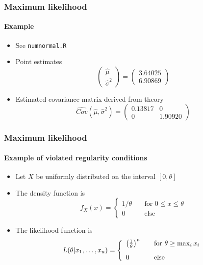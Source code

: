 \documentclass[notes=show]{beamer}
\begin{document}
\begin{frame}\frametitle{Maximum likelihood}\framesubtitle{Example}
\begin{itemize}
    \item See \texttt{numnormal.R}
    \item Point estimates
    \begin{equation*}
        \left(
        \begin{array}{c}
        \hat{\mu} \\
        \hat{\sigma}^{2}
        \end{array}
        \right) =\left(
        \begin{array}{c}
        3.64025 \\
        6.90869%
        \end{array}
        \right)
    \end{equation*}
    \item Estimated covariance matrix derived from theory%
    \begin{equation*}
        \widehat{Cov}\left( \hat{\mu},\hat{\sigma}^{2}\right) =\left(
        \begin{array}{cc}
        0.13817 & 0 \\
        0 & 1.90920
        \end{array}
        \right)
    \end{equation*}
\end{itemize}
\end{frame}


\begin{frame}\frametitle{Maximum likelihood}\framesubtitle{Example of violated regularity conditions}
\begin{itemize}
    \item Let $X$ be uniformly distributed on the interval $[0,\theta ]$
    \item The density function is
    \begin{equation*}
        f_{X}\left( x\right) =\left\{
        \begin{array}{ll}
        1/\theta & \quad \text{for }0\leq x\leq \theta \\
        0 & \quad \text{else}
        \end{array}%
        \right.
    \end{equation*}
    \item The likelihood function is
    \begin{equation*}
        L(\theta |x_{1},\ldots ,x_{n})=\left\{
        \begin{array}{ll}
        \left( \frac{1}{\theta }\right) ^{n} & \text{\quad for }\theta \geq
        \max_{i}x_{i} \\[3mm]
        0 & \quad \text{else}
        \end{array}%
        \right.
    \end{equation*}
\end{itemize}
\end{frame}
\end{document}
